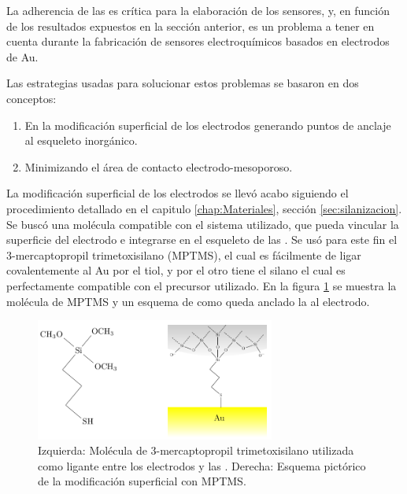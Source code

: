 			La adherencia de las \pdm\space es crítica para la elaboración de los sensores, y, en función de los resultados expuestos en la sección anterior, es un problema a tener en cuenta durante la fabricación de sensores electroquímicos basados en electrodos de Au.

			Las estrategias usadas para solucionar estos problemas se basaron en dos conceptos:
				\begin{enumerate}

					\item En la modificación superficial de los electrodos generando puntos de anclaje al esqueleto inorgánico.

					\item Minimizando el área de contacto electrodo-mesoporoso.

					\end{enumerate}
			La modificación superficial de los electrodos se llevó acabo siguiendo el procedimiento detallado en el capitulo \ref{chap:Materiales}, sección \ref{sec:silanizacion}. Se buscó una molécula compatible con el sistema utilizado, que pueda vincular la superficie del electrodo e integrarse en el esqueleto de las \pdm. Se usó para este fin el 3-mercaptopropil trimetoxisilano (MPTMS), el cual es fácilmente de ligar covalentemente al Au\cite{Gosser} por el tiol, y por el otro tiene el silano el cual es perfectamente compatible con el precursor utilizado\cite{Wu2014,Wu2013,Chen2011}. En la figura \ref{fig:mod_sup} se muestra la molécula de MPTMS y un esquema de como queda anclado la \pdm\space al electrodo.
					\begin{figure}[!ht]
							\begin{center}
							\includegraphics[width=0.70\textwidth]{Esquemas/mod_sup.pdf}
							\caption[Modificación superficial de los electrodos.]{Izquierda: Molécula de  3-mercaptopropil trimetoxisilano utilizada como ligante entre los electrodos y las \pdm. Derecha: Esquema pictórico de la modificación superficial con MPTMS.}
							\label{fig:mod_sup}
							\end{center}
							\end{figure}
